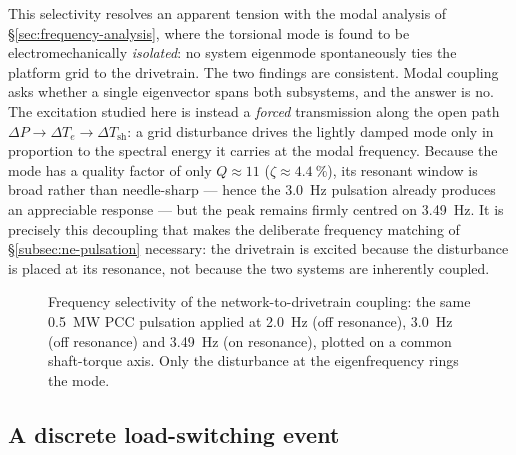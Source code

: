 This selectivity resolves an apparent tension with the modal analysis of
\S\ref{sec:frequency-analysis}, where the torsional mode is found to be
electromechanically \emph{isolated}: no system eigenmode spontaneously ties the
platform grid to the drivetrain. The two findings are consistent. Modal coupling
asks whether a single eigenvector spans both subsystems, and the answer is no.
The excitation studied here is instead a \emph{forced} transmission along the
open path $\Delta P \!\to\! \Delta T_e \!\to\! \Delta T_{\mathrm{sh}}$: a grid
disturbance drives the lightly damped mode only in proportion to the spectral
energy it carries at the modal frequency. Because the mode has a quality factor
of only $Q \approx 11$ ($\zeta \approx \SI{4.4}{\percent}$), its resonant window
is broad rather than needle-sharp --- hence the \SI{3.0}{\hertz} pulsation
already produces an appreciable response --- but the peak remains firmly centred
on \SI{3.49}{\hertz}. It is precisely this decoupling that makes the deliberate
frequency matching of \S\ref{subsec:ne-pulsation} necessary: the drivetrain is
excited because the disturbance is placed at its resonance, not because the two
systems are inherently coupled.

\begin{figure}[t]
  \centering
  \caption{Frequency selectivity of the network-to-drivetrain coupling: the same
  \SI{0.5}{\mega\watt} PCC pulsation applied at \SI{2.0}{\hertz} (off resonance),
  \SI{3.0}{\hertz} (off resonance) and \SI{3.49}{\hertz} (on resonance), plotted
  on a common shaft-torque axis. Only the disturbance at the eigenfrequency rings
  the mode.}
  \label{fig:ne-selectivity}
\end{figure}

\subsection{A discrete load-switching event}
\label{subsec:ne-step}

